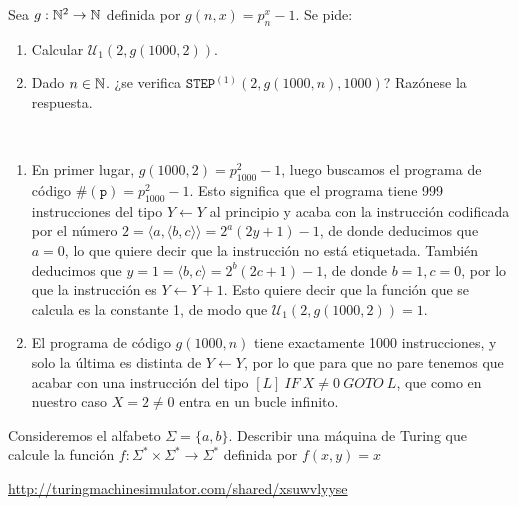 \documentclass[twoside]{article}
\begin{document}
\begin{ejercicio}{4}
Sea $g : \mathbb{N}^2 \to \mathbb{N}$ definida por $g(n, x) = p^x_n - 1$. Se pide:
\begin{enumerate}
\item Calcular $\mathcal{U}_1(2, g(1000, 2))$.
\item Dado $n \in \mathbb{N}$. ¿se verifica $\texttt{STEP}^{(1)}(2, g(1000, n), 1000)$? Razónese la respuesta.
\end{enumerate}
\end{ejercicio}
\begin{solucion}\
\begin{enumerate}
\item En primer lugar, $g(1000,2)=p_{1000}^2-1$, luego buscamos el programa de código $\#(\texttt{p})=p_{1000}^2-1$. Esto significa que el programa tiene 999 instrucciones del tipo $Y\leftarrow Y$ al principio y acaba con la instrucción codificada por el número $2=\langle a,\langle b,c\rangle\rangle=2^a(2y+1)-1$, de donde deducimos que $a=0$, lo que quiere decir que la instrucción no está etiquetada. También deducimos que $y=1=\langle b,c\rangle=2^b(2c+1)-1$, de donde $b=1, c=0$, por lo que la instrucción es $Y\leftarrow Y+1$. Esto quiere decir que la función que se calcula es la constante 1, de modo que $\mathcal{U}_1(2, g(1000, 2))=1$.
\item El programa de código $g(1000,n)$ tiene exactamente 1000 instrucciones, y solo la última es distinta de $Y\leftarrow Y$, por lo que para que no pare tenemos que acabar con una instrucción del tipo $[L]\ IF\ X\neq 0\ GOTO\ L$, que como en nuestro caso $X=2\neq 0$ entra en un bucle infinito.
\end{enumerate}
\end{solucion}

\newpage

\begin{ejercicio}{5}
Consideremos el alfabeto $\Sigma = \{a, b\}$. Describir una máquina de
Turing que calcule la función $f : \Sigma^* \times \Sigma^* \to \Sigma^*$ definida por $f(x, y) = x$
\end{ejercicio}
\begin{solucion}
\url{http://turingmachinesimulator.com/shared/xsuwvlyyse}
\end{solucion}
\end{document}
